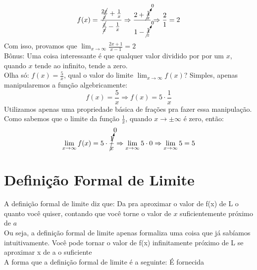 \documentclass{article}
\begin{document}
\[
f(x) = \frac{\frac{2\cancel{x}}{\cancel{x}} + \frac{1}{x}}{\frac{\cancel{x}}{\cancel{x}} - \frac{1}{x}} \Rightarrow \frac{2+\cancelto{0}{\frac{1}{x}}}
     {1-\cancelto{0}{\frac{1}{z}}} \Rightarrow \frac{2}{1} = 2
\]
Com isso, provamos que $\lim_{x \to \infty} \frac{2x + 1}{x-1}=2$
\\[2pt]
Bônus: Uma coisa interessante é que qualquer valor dividido por por um $x$, quando $x$ tende ao infinito, tende a zero.
\\[2pt]
Olha só: $f(x) = \frac{5}{x}$, qual o valor do limite $\lim_{x \to \infty}f(x)$? Simples, apenas manipularemos a função algebricamente:
\[
f(x) = \frac{5}{x} \Rightarrow f(x) = 5 \cdot \frac{1}{x}
\]
Utilizamos apenas uma propriedade básica de frações pra fazer essa manipulação. Como sabemos que o limite da função $\frac{1}{x}$, quando $x \to \pm \infty$ é zero, então:
\[
\lim_{x \to \infty} f(x) = 5 \cdot \cancelto{0}{\frac{1}{x}} \Rightarrow \lim\limits_{x \to \infty} 5 \cdot 0 \Rightarrow \lim\limits_{x \to \infty} 5 = 5
\]

\section{Definição Formal de Limite}
A definição formal de limite diz que: Da pra aproximar o valor de f(x) de L o quanto você quiser, contando que você torne o valor de $x$ suficientemente próximo de $a$
\\[2pt]
Ou seja, a definição formal de limite apenas formaliza uma coisa que já sabíamos intuitivamente. Você pode tornar o valor de f(x) infinitamente próximo de L se aproximar x de a o suficiente
\\[2pt]
A forma que a definição formal de limite é a seguinte: É fornecida
\end{document}

